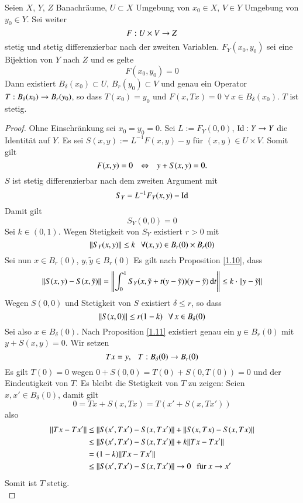 \begin{theorem}\label{1.12}
    Seien $X$, $Y$, $Z$ Banachräume, $U\subset X$ Umgebung von $x_0\in X$, $V\in Y$ Umgebung von 
    $y_0 \in Y$. Sei weiter
    \[F:U\times V\rightarrow Z\]
    stetig und stetig differenzierbar nach der zweiten Variablen. $F_Y(x_0,y_0)$ sei eine Bijektion
    von $Y$ nach $Z$ und es gelte
    \[
        F(x_0,y_0)=0
    \]
    Dann existiert $B_\delta(x_0)\subset U$, $B_r(y_0)\subset V$ und genau ein Operator 
    $T:B_\delta(x_0)\rightarrow B_r(y_0)$, so dass $T(x_0)=y_0$ und $F(x,Tx)=0$ $\forall \, x\in B_\delta(x_0)$.
    $T$ ist stetig.
\end{theorem}

\begin{proof}
    Ohne Einschränkung sei $x_0=y_0=0$. Sei $L:= F_Y(0,0)$, $\mathrm{Id}: Y\rightarrow Y$ die Identität auf $Y$. Es 
    sei $S(x,y):= L^{-1}F(x,y)-y$ für $(x,y)\in U\times V$. Somit gilt
    \[
        F(x,y)=0 \hspace{.25cm} \Leftrightarrow \hspace{.25cm} y+S(x,y)=0.
    \]
    $S$ ist stetig differenzierbar nach dem zweiten Argument mit
    \[
        S_Y=L^{-1} F_Y(x,y)-\mathrm{Id}
    \]
    Damit gilt
    \[
        S_Y(0,0)=0
    \]
    Sei $k\in (0,1)$. Wegen Stetigkeit von $S_Y$ existiert $r>0$ mit 
    \[
        \|S_Y(x,y)\|\leq k \hspace{.25cm} \forall (x,y)\in B_r(0)\times B_r(0)
    \]
    Sei nun $x\in B_r(0)$, $y, \tilde y \in B_r(0)$
    Es gilt nach Proposition \ref{1.10}, dass
    \[
        \|S(x,y)-S(x,\tilde y)\|=\left\|\int_0^1 S_Y(x,\tilde y +t(y-\tilde y)) (y-\tilde y) \, \mathrm{d} t 
        \right\|\leq k\cdot\|y-\tilde y\|
    \]
    Wegen $S(0,0)$ und Stetigkeit von $S$ existiert $\delta \leq r$, so dass
    \[
        \|S(x,0)\|\leq r(1-k) \hspace{.25cm} \forall \, x \in B_\delta (0)
    \]
    Sei also $x\in B_\delta(0)$. Nach Proposition \ref{1.11} existiert genau ein $y\in B_r(0)$ mit
    $y+S(x,y)=0$. Wir setzen
    \[
        Tx=y, \hspace{.25cm} T:B_\delta(0)\rightarrow B_r(0)
    \]
    Es gilt $T(0)=0$ wegen $0+S(0,0)=T(0)+S(0,T(0))=0$ und der Eindeutigkeit von $T$. Es bleibt die
    Stetigkeit von $T$ zu zeigen: Seien $x,x'\in B_\delta (0)$, damit gilt
    \[
        0=Tx+S(x,Tx)=T(x'+S(x,Tx'))
    \]
    also
    \begin{align*}
        \|Tx-Tx'\|&\leq \|S(x',Tx')-S(x,Tx')\|+\|S(x,Tx)-S(x,Tx)\|\\
            &\leq \|S(x',Tx') - S(x,Tx')\|+k\|Tx-Tx'\|\\
            &= (1-k)\|Tx-Tx'\|\\
            &\leq \|S(x',Tx')-S(x,Tx')\| \rightarrow 0 \hspace{.25cm} \text{für $x\rightarrow x'$} 
    \end{align*}
    Somit ist $T$ stetig.
    \[\]
\end{proof}

